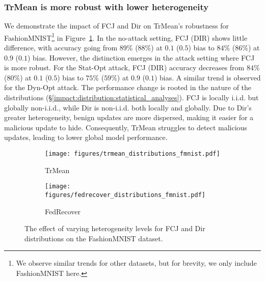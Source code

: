 \subsubsection{TrMean is more robust with lower heterogeneity}\label{impact:distribution:trmean}
We demonstrate the impact of FCJ and Dir on TrMean's robustness for FashionMNIST\footnote{We observe similar trends for other datasets, but for brevity, we only include FashionMNIST here.} in Figure~\ref{fig:trmean_distributions_fmnist}. In the no-attack setting, FCJ (DIR) shows little difference, with accuracy going from $89\%$ ($88\%$) at $0.1$ ($0.5$) bias to $84\%$ ($86\%$) at $0.9$ ($0.1$) bias. However, the distinction emerges in the attack setting where FCJ is more robust. For the Stat-Opt attack, FCJ (DIR) accuracy decreases from $84\%$ ($80\%$) at $0.1$ ($0.5$) bias to $75\%$ ($59\%$) at $0.9$ ($0.1$) bias. A similar trend is observed for the Dyn-Opt attack. The performance change is rooted in the nature of the distributions (\S\ref{impact:distribution:statistical_analyses}). FCJ is locally i.i.d. but globally non-i.i.d., while Dir is non-i.i.d. both locally and globally. Due to Dir's greater heterogeneity, benign updates are more dispersed, making it easier for a malicious update to hide. Consequently, TrMean struggles to detect malicious updates, leading to lower global model performance.



\begin{figure}[t]
    \centering
    \begin{subfigure}[b]{0.48\columnwidth}
        \texttt{[image: figures/trmean\_distributions\_fmnist.pdf]}
        \caption{TrMean}
        \label{fig:trmean_distributions_fmnist}
    \end{subfigure}
    \begin{subfigure}[b]{0.48\columnwidth}
        \texttt{[image: figures/fedrecover\_distributions\_fmnist.pdf]}
        \caption{FedRecover}
        \label{fig:fedrecover_distributions_fmnist}
    \end{subfigure}
    \caption{The effect of varying heterogeneity levels for FCJ and Dir distributions on the FashionMNIST dataset.}
    \label{fig:distributions_trmean_fedrecover}
\end{figure}
